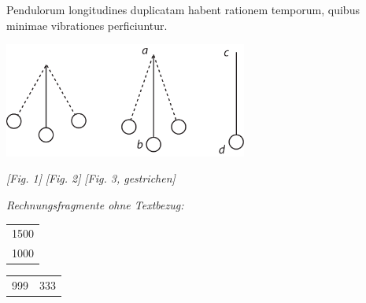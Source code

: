                 \vspace*{8mm}
                \pstart 
                \normalsize
            \noindent[62~r\textsuperscript{o}]  Pendulorum longitudines duplicatam habent rationem temporum, quibus minimae vibrationes\protect{} perficiuntur.\pend \pstart \vspace{2em} \begin{center}                    
                \includegraphics[width=0.6\textwidth]{images/62-123.pdf}
              
                      \textit{[Fig. 1]}\hspace*{4mm}  \textit{[Fig. 2]}\hspace*{4mm}  \textit{[Fig. 3, gestrichen]}
\vspace*{2mm}
                        \end{center}
                   
                    \vspace{2em} \lbrack \textit{Rechnungsfragmente ohne Textbezug:}\rbrack \pend \pstart \vspace{1em} \begin{tabular}{c}
                                   1500\\
                                   1000\\
                                  \end{tabular}
                    \begin{tabular}{cc}
                                  999 &333\\
                                 \end{tabular}
                     \pend 
 


 


 


 


 

